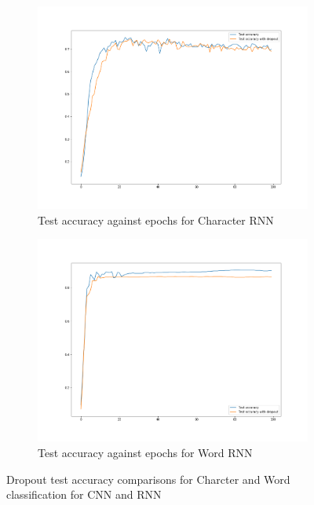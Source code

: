 \begin{figure}[H]
\begin{subfigure}{0.5\textwidth}
        \includegraphics[width=1\linewidth]{assets/plots2/q3_4.png}
        \caption{Test accuracy against epochs for Character RNN}
    \end{subfigure}
    \begin{subfigure}{0.5\textwidth}
        \centering
        \includegraphics[width=1\linewidth]{assets/plots2/q4_4.png}
        \caption{Test accuracy against epochs for Word RNN}
    \end{subfigure}
    \caption{Dropout test accuracy comparisons for Charcter and Word classification for CNN and RNN}
    \label{fig:2_4_3}
\end{figure}

